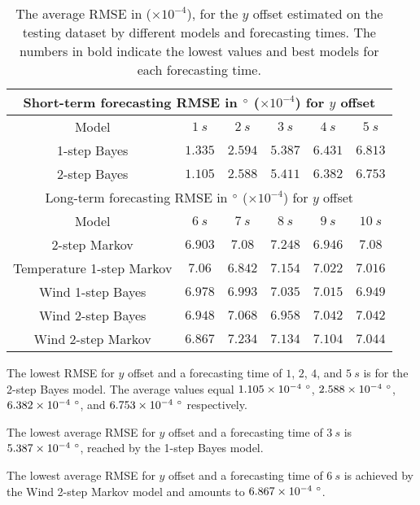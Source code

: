 \documentclass[preprint,12pt]{elsarticle}
\begin{document}
\begin{table}[!ht]
	\centering
	\begin{tabular}{|c|c|c|c|c|c|}
		\hline
		\multicolumn{6}{|c|}{Short-term forecasting RMSE in $\degree$ ($\times 10^{-4}$) for $y$ offset} \\ \hline
		Model & $1 \ s$ & $2 \ s$ & $3 \ s$ & $4 \ s$ & $5 \ s$ \\ \hline
		1-step Bayes & $1.335$ & $2.594$ & $\mathbf{5.387}$ & $6.431$ & $6.813$ \\ \hline
		2-step Bayes & $\mathbf{1.105}$ & $\mathbf{2.588}$ & $5.411$ & $\mathbf{6.382}$ & $\mathbf{6.753}$ \\ \hline
		\multicolumn{6}{|c|}{Long-term forecasting RMSE in $\degree$ ($\times 10^{-4}$) for $y$ offset} \\ \hline
		Model & $6 \ s$ & $7 \ s$ & $8 \ s$ & $9 \ s$ & $10 \ s$ \\ \hline
		2-step Markov & $6.903$ & $7.08$ & $7.248$ & $\mathbf{6.946}$ & $7.08$ \\ \hline
		Temperature 1-step Markov & $7.06$ & $\mathbf{6.842}$ & $7.154$ & $7.022$ & $7.016$ \\ \hline
		Wind 1-step Bayes & $6.978$ & $6.993$ & $7.035$ & $7.015$ & $\mathbf{6.949}$ \\ \hline
		Wind 2-step Bayes & $6.948$ & $7.068$ & $\mathbf{6.958}$ & $7.042$ & $7.042$ \\ \hline
		Wind 2-step Markov & $\mathbf{6.867}$ & $7.234$ & $7.134$ & $7.104$ & $7.044$ \\ \hline
	\end{tabular}
	\caption{The average RMSE in \degree ($\times 10^{-4}$), for the $y$ offset estimated on the testing dataset by different models and forecasting times. The numbers in bold indicate the lowest values and best models for each forecasting time.}
	\label{tab:best_latitude_RMSE}
\end{table}

The lowest RMSE for $y$ offset and a forecasting time of $1$, $2$, $4$, and $5 \ s$ is for the 2-step Bayes model. The average values equal $1.105 \times 10^{-4} \ \degree$, $2.588 \times 10^{-4} \ \degree$, $6.382 \times 10^{-4} \ \degree$, and $6.753 \times 10^{-4} \ \degree$ respectively.

The lowest average RMSE for $y$ offset and a forecasting time of $3 \ s$ is $5.387 \times 10^{-4} \ \degree$, reached by the 1-step Bayes model.

The lowest average RMSE for $y$ offset and a forecasting time of $6 \ s$ is achieved by the Wind 2-step Markov model and amounts to $6.867 \times 10^{-4} \ \degree $.
\end{document}
